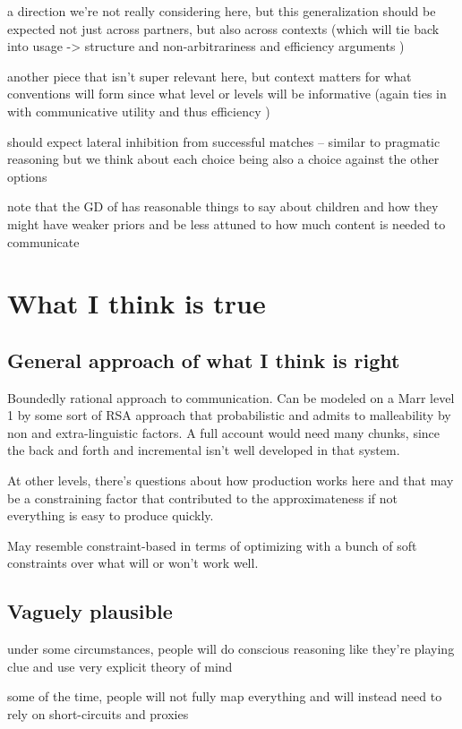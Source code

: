 \documentclass[]{article}
\begin{document}
a direction we're not really considering here, but this generalization should be expected not just across partners, but also across contexts (which will tie back into usage -> structure and non-arbitrariness and efficiency arguments )

another piece that isn't super relevant here, but context matters for what conventions will form since what level or levels will be informative (again ties in with communicative utility and thus efficiency )

should expect lateral inhibition from successful matches -- similar to pragmatic reasoning but we think about each choice being also a choice against the other options 

note that the GD of \cite{hawkins2021} has reasonable things to say about children and how they might have weaker priors and be less attuned to how much content is needed to communicate 






\section{What I think is true}
\subsection{General approach of what I think is right}



Boundedly rational approach to communication. Can be modeled on a Marr level 1 by some sort of RSA approach that probabilistic and admits to malleability by non and extra-linguistic factors. A full account would need many chunks, since the back and forth and incremental isn't well developed in that system. 

At other levels, there's questions about how production works here and that may be a constraining factor that contributed to the approximateness if not everything is easy to produce quickly. 

May resemble constraint-based in terms of optimizing with a bunch of soft constraints over what will or won't work well. 
\subsection{Vaguely plausible}
under some circumstances, people will do conscious reasoning like they're playing clue and use very explicit theory of mind 

some of the time, people will not fully map everything and will instead need to rely on short-circuits and proxies 
\end{document}

